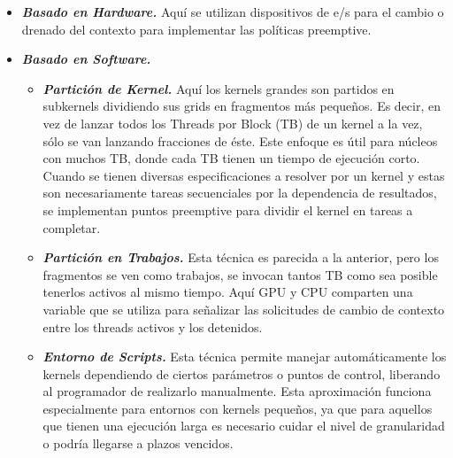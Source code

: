 \begin{itemize}
\item \textbf{\textit{Basado en Hardware.}} 
	Aquí se utilizan dispositivos de e/s para el cambio o drenado del contexto para implementar las políticas preemptive. 	

\item \textbf{\textit{Basado en Software.}}
	\begin{itemize}
	\item \textbf{\textit{Partición de Kernel.}}
		Aquí los kernels grandes son partidos en subkernels dividiendo sus grids en fragmentos más pequeños. Es decir, en vez de lanzar todos los Threads por Block (TB) de un kernel a la vez, sólo se van lanzando fracciones de éste. Este enfoque es útil para núcleos con muchos TB, donde cada TB tienen un tiempo de ejecución corto. Cuando se tienen diversas especificaciones a resolver por un kernel y estas son necesariamente tareas secuenciales por la dependencia de resultados, se implementan puntos preemptive para dividir el kernel en tareas a completar.  
	
	\item \textbf{\textit{Partición en Trabajos.}}
		Esta técnica es parecida a la anterior, pero los fragmentos se ven como trabajos, se invocan tantos TB como sea posible tenerlos activos al mismo tiempo. Aquí GPU y CPU comparten una variable que se utiliza para señalizar las solicitudes de cambio de contexto entre los threads activos y los detenidos.

	\item \textbf{\textit{Entorno de Scripts.}}	
		Esta técnica permite manejar automáticamente los kernels dependiendo de ciertos parámetros o puntos de control, liberando al programador de realizarlo manualmente. Esta aproximación funciona especialmente para entornos con kernels pequeños, ya que para aquellos que tienen una ejecución larga es necesario cuidar el nivel de granularidad o podría llegarse a plazos vencidos.
		
	\end{itemize}


\end{itemize}
